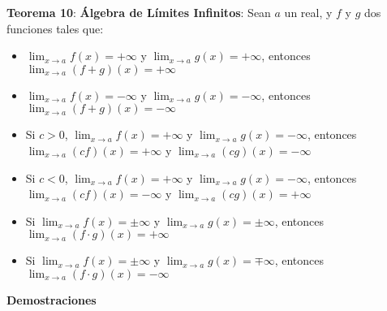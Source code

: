 \documentclass[11pt,a4paper]{article}
\begin{document}
\noindent \textbf{Teorema 10}: \textbf{\'Algebra de L\'imites Infinitos}: Sean $a$ un real, y $f$ y $g$ dos funciones tales que:
\begin{itemize}
\item $\displaystyle{\lim_{x \to a} f(x) = +\infty}$ y $\displaystyle{\lim_{x \to a} g(x) = +\infty}$, entonces $\displaystyle{\lim_{x \to a} (f+g)(x) = +\infty}$
\item $\displaystyle{\lim_{x \to a} f(x) = -\infty}$ y $\displaystyle{\lim_{x \to a} g(x) = -\infty}$, entonces $\displaystyle{\lim_{x \to a} (f+g)(x) = -\infty}$
\item Si $c>0$, $\displaystyle{\lim_{x \to a} f(x) = +\infty}$ y $\displaystyle{\lim_{x \to a} g(x) = -\infty}$, entonces $\displaystyle{\lim_{x \to a} (cf)(x) = +\infty}$ y $\displaystyle{\lim_{x \to a} (cg)(x) = -\infty}$
\item Si $c<0$, $\displaystyle{\lim_{x \to a} f(x) = +\infty}$ y $\displaystyle{\lim_{x \to a} g(x) = -\infty}$, entonces $\displaystyle{\lim_{x \to a} (cf)(x) = -\infty}$ y $\displaystyle{\lim_{x \to a} (cg)(x) = +\infty}$
\item Si $\displaystyle{\lim_{x \to a} f(x) = \pm \infty}$ y $\displaystyle{\lim_{x \to a} g(x) = \pm \infty}$, entonces $\displaystyle{\lim_{x \to a} (f\cdot g)(x) = + \infty}$
\item Si $\displaystyle{\lim_{x \to a} f(x) = \pm \infty}$ y $\displaystyle{\lim_{x \to a} g(x) = \mp \infty}$, entonces $\displaystyle{\lim_{x \to a} (f\cdot g)(x) = - \infty}$
\end{itemize}
\textbf{Demostraciones}
\end{document}
